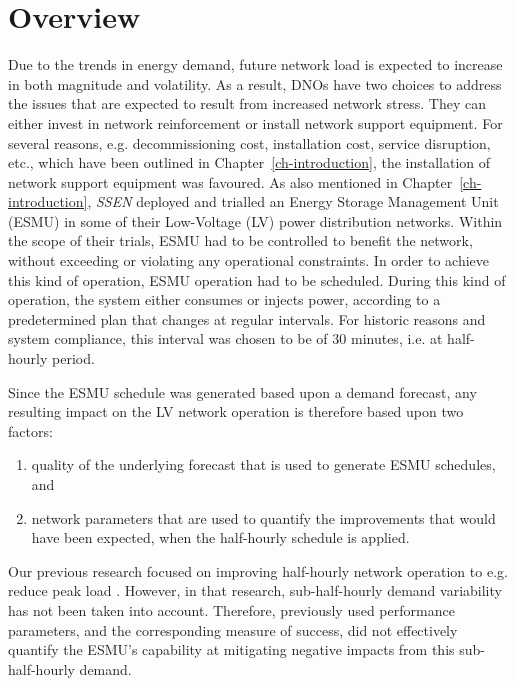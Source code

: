 \section{Overview}
\label{ch1:sec:overview}

Due to the trends in energy demand, future network load is expected to increase in both magnitude and volatility.
As a result, DNOs have two choices to address the issues that are expected to result from increased network stress.
They can either invest in network reinforcement or install network support equipment.
For several reasons, e.g. decommissioning cost, installation cost, service disruption, etc., which have been outlined in Chapter~\ref{ch-introduction}, the installation of network support equipment was favoured.
As also mentioned in Chapter~\ref{ch-introduction}, \textit{SSEN} deployed and trialled an Energy Storage Management Unit (ESMU) in some of their Low-Voltage (LV) power distribution networks.
Within the scope of their trials, ESMU had to be controlled to benefit the network, without exceeding or violating any operational constraints.
In order to achieve this kind of operation, ESMU operation had to be scheduled.
During this kind of operation, the system either consumes or injects power, according to a predetermined plan that changes at regular intervals.
For historic reasons and system compliance, this interval was chosen to be of 30 minutes, i.e. at half-hourly period.

Since the ESMU schedule was generated based upon a demand forecast, any resulting impact on the LV network operation is therefore based upon two factors:

\begin{enumerate}
	\item quality of the underlying forecast that is used to generate ESMU schedules, and
	\item network parameters that are used to quantify the improvements that would have been expected, when the half-hourly schedule is applied.
\end{enumerate}

Our previous research focused on improving half-hourly network operation to e.g. reduce peak load \cite{Rowe2014a, Yunusov2011}.
However, in that research, sub-half-hourly demand variability has not been taken into account.
Therefore, previously used performance parameters, and the corresponding measure of success, did not effectively quantify the ESMU's capability at mitigating negative impacts from this sub-half-hourly demand.

